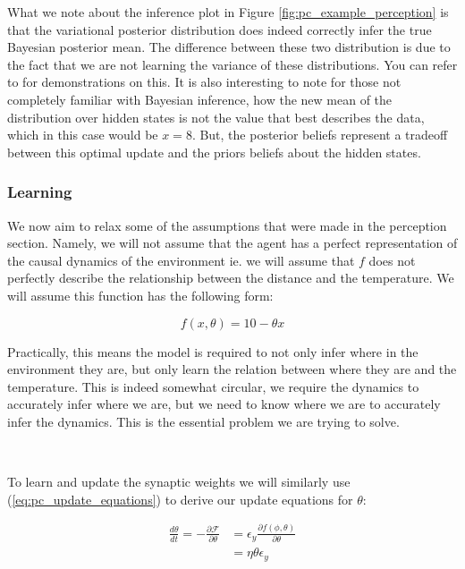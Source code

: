 \documentclass{article}
\newcommand{\refp}[1]{(\ref{#1})}
\begin{document}
What we note about the inference plot in Figure \ref{fig:pc_example_perception} is that the variational posterior distribution does indeed correctly infer the true Bayesian posterior mean. The difference between these two distribution is due to the fact that we are not learning the variance of these distributions. You can refer to \citet{bogacz2017tutorial, friston2003learning} for demonstrations on this. It is also interesting to note for those not completely familiar with Bayesian inference, how the new mean of the distribution over hidden states is not the value that best describes the data, which in this case would be $x = 8$. But, the posterior beliefs represent a tradeoff between this optimal update and the priors beliefs about the hidden states.

\subsubsection{Learning}

We now aim to relax some of the assumptions that were made in the perception section. Namely, we will not assume that the agent has a perfect representation of the causal dynamics of the environment ie. we will assume that $f$ does not perfectly describe the relationship between the distance and the temperature. We will assume this function has the following form:

\begin{equation}
	f(x, \theta) = 10 - \theta x
\end{equation}

Practically, this means the model is required to not only infer where in the environment they are, but only learn the relation between where they are and the temperature. This is indeed somewhat circular, we require the dynamics to accurately infer where we are, but we need to know where we are to accurately infer the dynamics. This is the essential problem we are trying to solve. 

\

To learn and update the synaptic weights we will similarly use \refp{eq:pc_update_equations} to derive our update equations for $\theta$:

\begin{equation}\label{eq:theta_gradient_descent}
	\begin{aligned}
		\frac{d \theta}{dt} = - \frac{\partial \mathcal{F}}{\partial \theta}  &= \epsilon_y \frac{\partial f(\phi, \theta)}{\partial \theta} \\
		&= \eta \theta \epsilon_y
	\end{aligned}
\end{equation}
\end{document}
